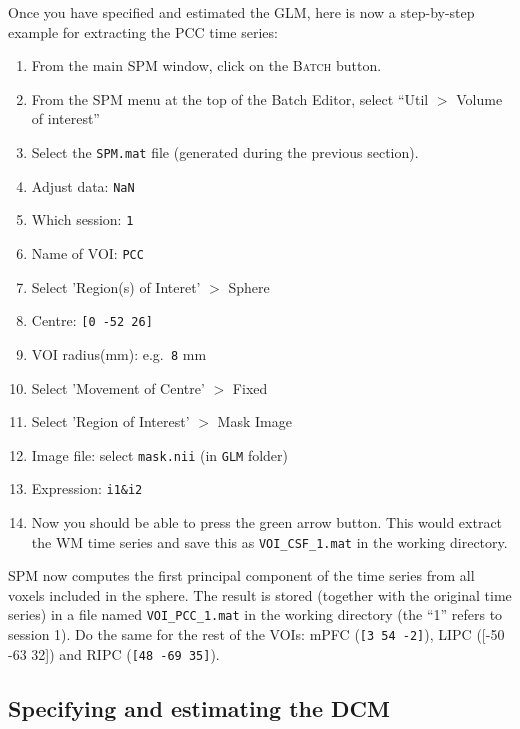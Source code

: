 Once you have specified and estimated the GLM, here is now a step-by-step example for extracting the PCC time series:
\begin{enumerate}
 \item From the main SPM window, click on the \textsc{Batch} button.
 \item From the SPM menu at the top of the Batch Editor, select ``Util $>$ Volume of interest''
 \item Select the \texttt{SPM.mat} file (generated during the previous section).
 \item Adjust data: \texttt{NaN}
 \item Which session: \texttt{1}
 \item Name of VOI: \texttt{PCC}
 \item Select 'Region(s) of Interet' $>$ Sphere
 \item Centre: \texttt{[0 -52 26]}
 \item VOI radius(mm): e.g.\texttt{ 8} mm
 \item Select 'Movement of Centre' $>$ Fixed
 \item Select 'Region of Interest' $>$ Mask Image
 \item Image file: select \texttt{mask.nii} (in \texttt{GLM} folder)
 \item Expression: \texttt{i1\&i2}
 \item Now you should be able to press the green arrow button. This would extract the WM time series and save this as  \texttt{VOI\_CSF\_1.mat} in the working directory.
\end{enumerate}
SPM now computes the first principal component of the time series from all voxels included in the sphere. The result is stored (together with the original time series) in a file named \texttt{VOI\_PCC\_1.mat} in the working directory (the ``1'' refers to session 1). Do the same for the rest of the VOIs: mPFC (\texttt{[3 54 -2]}), LIPC ({[-50 -63 32]}) and RIPC (\texttt{[48 -69 35]}).

\subsection{Specifying and estimating the DCM}


